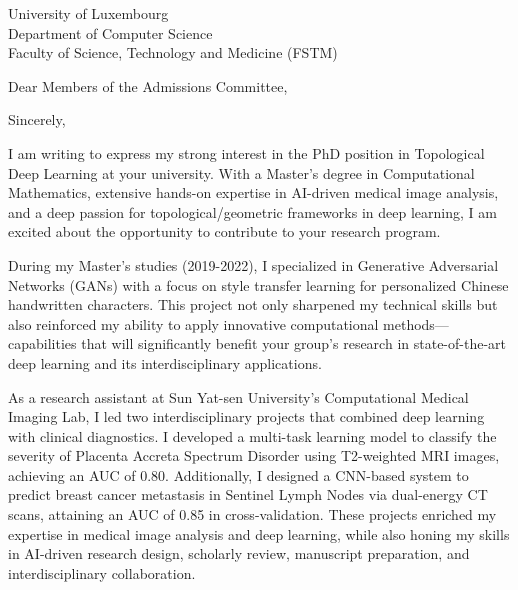 \documentclass[10pt,a4paper,roman]{moderncv}
\begin{document}
\vspace{-4em}
{
University of Luxembourg\\
Department of Computer Science\\
Faculty of Science, Technology and Medicine (FSTM)
}
\date{\today}
\opening{Dear Members of the Admissions Committee,}
\closing{Sincerely,}
\makelettertitle
\thispagestyle{empty}
\pagestyle{empty}
I am writing to express my strong interest in the PhD position in 
Topological Deep Learning at your university. 
With a Master's degree in Computational Mathematics, 
extensive hands-on expertise in AI-driven medical image analysis, 
and a deep passion for topological/geometric frameworks in deep learning, 
I am excited about the opportunity to contribute to your research program.

During my Master's studies (2019-2022), 
I specialized in Generative Adversarial Networks (GANs) with a focus on style transfer learning 
for personalized Chinese handwritten characters. 
This project not only sharpened my technical skills but also reinforced my ability 
to apply innovative computational methods—capabilities that will significantly benefit your group's research 
in state-of-the-art deep learning and its interdisciplinary applications.

As a research assistant at Sun Yat-sen University's Computational Medical Imaging Lab, 
I led two interdisciplinary projects that combined deep learning with clinical diagnostics. 
I developed a multi-task learning model 
to classify the severity of Placenta Accreta Spectrum Disorder using T2-weighted MRI images, 
achieving an AUC of 0.80. 
Additionally, I designed a CNN-based system 
to predict breast cancer metastasis in Sentinel Lymph Nodes via dual-energy CT scans, 
attaining an AUC of 0.85 in cross-validation. 
These projects enriched my expertise in medical image analysis and deep learning, 
while also honing my skills in AI-driven research design, scholarly review, manuscript preparation, 
and interdisciplinary collaboration.
\end{document}
